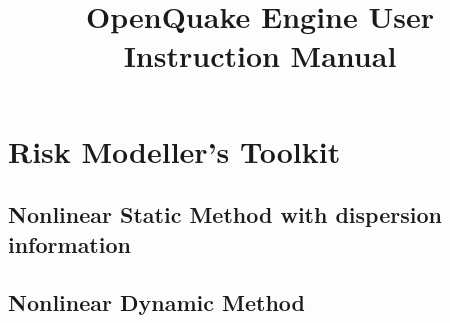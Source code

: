 \documentclass[12pt,a4paper,headings=small,version=last,dvips]{scrbook}
\begin{document}

\restoregeometry
\cleardoublepage
%
\setcounter{page}{1}
\begin{titlepage}
	\titlehead{\emph{``OpenQuake: Calculate, share, explore''}}
	\title{ \textcolor{blue01}{\textsf{\bfseries\Huge OpenQuake Engine User Instruction Manual}}  }
	\date{}
\end{titlepage}
\pagestyle{scrheadings}
\maketitle
%
%
\cleardoublepage
%
\tableofcontents
\part{Risk Modeller's Toolkit}
\chapter{Nonlinear Static Method with dispersion information}
	
\chapter{Nonlinear Dynamic Method}
	


\end{document}
